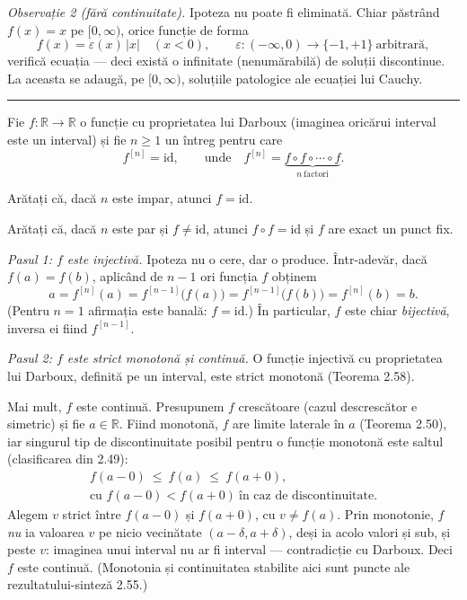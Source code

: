 \emph{Observație 2 (fără continuitate).} Ipoteza nu poate fi eliminată. Chiar păstrând $f(x)=x$ pe $[0,\infty)$, orice funcție de forma
\[ f(x)=\varepsilon(x)\,|x|\quad (x<0),\qquad \varepsilon:(-\infty,0)\to\{-1,+1\}\ \text{arbitrară}, \]
verifică ecuația --- deci există o infinitate (nenumărabilă) de soluții discontinue. La aceasta se adaugă, pe $[0,\infty)$, soluțiile patologice ale ecuației lui Cauchy.
\vspace{1mm}\hrule

Fie $f:\mathbb{R}\to\mathbb{R}$ o funcție cu proprietatea lui Darboux (imaginea oricărui interval este un interval) și fie $n\ge1$ un întreg pentru care
\[ f^{[n]}=\mathrm{id},\qquad\text{unde}\quad f^{[n]}=\underbrace{f\circ f\circ\cdots\circ f}_{n\ \text{factori}} . \]
\begin{parti}
  \item Arătați că, dacă $n$ este impar, atunci $f=\mathrm{id}$.
  \item Arătați că, dacă $n$ este par și $f\neq\mathrm{id}$, atunci $f\circ f=\mathrm{id}$ și $f$ are exact un punct fix.
\end{parti}
\sol \emph{Pasul 1: $f$ este injectivă.} Ipoteza nu o cere, dar o produce. Într-adevăr, dacă $f(a)=f(b)$, aplicând de $n-1$ ori funcția $f$ obținem
\[ a=f^{[n]}(a)=f^{[n-1]}\bigl(f(a)\bigr)=f^{[n-1]}\bigl(f(b)\bigr)=f^{[n]}(b)=b . \]
(Pentru $n=1$ afirmația este banală: $f=\mathrm{id}$.) În particular, $f$ este chiar \emph{bijectivă}, inversa ei fiind $f^{[n-1]}$.

\emph{Pasul 2: $f$ este strict monotonă și continuă.} O funcție injectivă cu proprietatea lui Darboux, definită pe un interval, este strict monotonă (Teorema 2.58).

Mai mult, $f$ este continuă. Presupunem $f$ crescătoare (cazul descrescător e simetric) și fie $a\in\mathbb{R}$. Fiind monotonă, $f$ are limite laterale în $a$ (Teorema 2.50), iar singurul tip de discontinuitate posibil pentru o funcție monotonă este saltul (clasificarea din 2.49):
\[ \begin{gathered} f(a-0)\ \le\ f(a)\ \le\ f(a+0),\\ \text{cu }f(a-0)<f(a+0)\ \text{în caz de discontinuitate}. \end{gathered} \]
Alegem $v$ strict între $f(a-0)$ și $f(a+0)$, cu $v\neq f(a)$. Prin monotonie, $f$ \emph{nu} ia valoarea $v$ pe nicio vecinătate $(a-\delta,a+\delta)$, deși ia acolo valori și sub, și peste $v$: imaginea unui interval nu ar fi interval --- contradicție cu Darboux. Deci $f$ este continuă. (Monotonia și continuitatea stabilite aici sunt puncte ale rezultatului-sinteză 2.55.)

